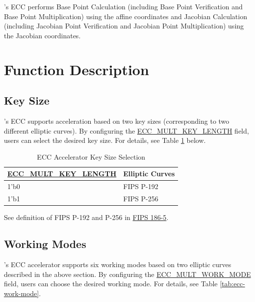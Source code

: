 \documentclass[main\_\_EN.tex]{subfiles}
\begin{document}
\chipname{}'s ECC performs Base Point Calculation (including Base Point Verification and Base Point Multiplication) using the affine coordinates and Jacobian Calculation (including Jacobian Point Verification and Jacobian Point Multiplication) using the Jacobian coordinates. 

\section{Function Description}
\label{sec:ecc-mode-config}
\subsection{Key Size}

\chipname{}'s ECC supports acceleration based on two key sizes (corresponding to two different elliptic curves). By configuring the \hyperref[fielddesc:ECCMULTKEYLENGTH]{ECC\_MULT\_KEY\_LENGTH} field, users can select the desired key size. For details, see Table \ref{tab:ecc-key-length} below.

\begin{table}[H]
    \centering
    \caption{ECC Accelerator Key Size Selection}
    \label{tab:ecc-key-length}
    \begin{threeparttable}
    \begin{tabular}{|p{4.2cm}|p{3.6cm}|}
    \hline
        \rowcolor{lightgray}
        \textbf{\hyperref[fielddesc:ECCMULTKEYLENGTH]{ECC\_MULT\_KEY\_LENGTH}} & \textbf{Elliptic Curves\tnote{*}} \\ \hline
        1'b0 & FIPS P-192  \\\hline
        1'b1 & FIPS P-256  \\\hline
    \end{tabular}
    \begin{tablenotes}
        \item[*] See definition of FIPS P-192 and P-256 in \href{https://nvlpubs.nist.gov/nistpubs/FIPS/NIST.FIPS.186-5.pdf}{FIPS 186-5}.
    \end{tablenotes}
    \end{threeparttable}
\end{table}

\subsection{Working Modes}

\chipname{}'s ECC accelerator supports six working modes based on two elliptic curves described in the above section. By configuring the \hyperref[fielddesc:ECCMULTWORKMODE]{ECC\_MULT\_WORK\_MODE} field, users can choose the desired working mode. For details, see Table \ref{tab:ecc-work-mode}.
\end{document}
